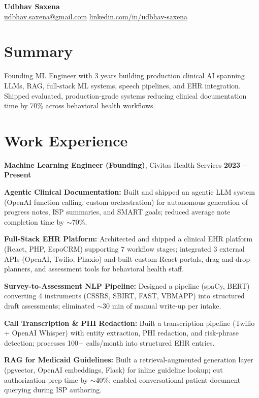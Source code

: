 \documentclass[letterpaper,10pt]{article}
\newcommand{\role}[3]{%
  \vspace{2pt}
  \textbf{#1}, #2 \hfill \textbf{#3}\\
}
\newcommand{\entry}[2]{\item \textbf{#1:} #2}
\begin{document}
\begin{center}
  {\LARGE\bfseries\color{accent} Udbhav Saxena}\\[4pt]
  \href{mailto:udbhav.saxena@gmail.com}{udbhav.saxena@gmail.com}
  \quad\textbar\quad
  \href{https://linkedin.com/in/udbhav-saxena}{linkedin.com/in/udbhav-saxena}
\end{center}

\section{Summary}
Founding ML Engineer with 3 years building production clinical AI spanning LLMs, RAG, full-stack ML systems, speech pipelines, and EHR integration. Shipped evaluated, production-grade systems reducing clinical documentation time by 70\% across behavioral health workflows.

\section{Work Experience}

\role{Machine Learning Engineer (Founding)}{Civitas Health Services}{2023 -- Present}
\begin{tightitemize}
  \entry{Agentic Clinical Documentation}{Built and shipped an agentic LLM system (OpenAI function calling, custom orchestration) for autonomous generation of progress notes, ISP summaries, and SMART goals; reduced average note completion time by $\sim$70\%.}
  \entry{Full-Stack EHR Platform}{Architected and shipped a clinical EHR platform (React, PHP, EspoCRM) supporting 7 workflow stages; integrated 3 external APIs (OpenAI, Twilio, Phaxio) and built custom React portals, drag-and-drop planners, and assessment tools for behavioral health staff.}
  \entry{Survey-to-Assessment NLP Pipeline}{Designed a pipeline (spaCy, BERT) converting 4 instruments (CSSRS, SBIRT, FAST, VBMAPP) into structured draft assessments; eliminated $\sim$30 min of manual write-up per intake.}
  \entry{Call Transcription \& PHI Redaction}{Built a transcription pipeline (Twilio + OpenAI Whisper) with entity extraction, PHI redaction, and risk-phrase detection; processes 100+ calls/month into structured EHR entries.}
  \entry{RAG for Medicaid Guidelines}{Built a retrieval-augmented generation layer (pgvector, OpenAI embeddings, Flask) for inline guideline lookup; cut authorization prep time by $\sim$40\%; enabled conversational patient-document querying during ISP authoring.}
\end{tightitemize}
\end{document}
